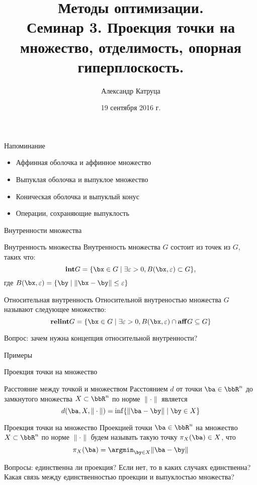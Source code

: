 \documentclass[12pt,russian]{beamer}
\title[Семинар 3]{Методы оптимизации. \\
 Семинар 3. Проекция точки на множество, отделимость, опорная гиперплоскость.}
\author{Александр Катруца}
\institute{Московский физико-технический институт,\\
Факультет Управления и Прикладной Математики}
\date{19 сентября 2016 г.}
\newcommand{\relint}{\mathbf{relint}}
\newcommand{\inter}{\mathbf{int}}
\begin{document}
\begin{frame}
\maketitle
\end{frame}

\begin{frame}{Напоминание}
\begin{itemize}
\item Аффинная оболочка и аффинное множество
\item Выпуклая оболочка и выпуклое множество
\item Коническая оболочка и выпуклый конус
\item Операции, сохраняющие выпуклость
\end{itemize}
\end{frame}

\begin{frame}{Внутренности множества}

\begin{block}{Внутренность множества}
Внутренность множества $G$ состоит из точек из $G$, таких что:
\[ 
\inter G = \{ \bx \in G \; | \; \exists \varepsilon > 0, B(\bx, \varepsilon) \subset G\},
\]
где $B(\bx, \varepsilon) = \{ \by \; | \; \| \bx - \by \| \leq \varepsilon \}$
\end{block}

\begin{block}{Относительная внутренность}
Относительной внутреностью множества $G$ называют следующее множество: 
\[
\relint G = \{ \bx \in G \; | \; \exists \varepsilon > 0,  B(\bx, \varepsilon) \cap \mathbf{aff} G \subseteq G \}
\]
\end{block}
Вопрос: зачем нужна концепция относительной внутренности?
\end{frame}

\begin{frame}{Примеры}

\end{frame}

\begin{frame}{Проекция точки на множество}
\small
\begin{block}{Расстояние между точкой и множеством}
Расстоянием $d$ от точки $\ba \in \bbR^n$ до замкнутого множества $X \subset \bbR^n$ по норме $\| \cdot \|$ является
\vspace{-4mm}
\[
d(\ba, X, \| \cdot \|) = \inf\{\| \ba - \by \| \; | \; \by \in X\}
\]
\end{block}
\begin{block}{Проекция точки на множество}
Проекцией точки $\ba \in \bbR^n$ на множество $X \subset \bbR^n$ по норме $\| \cdot \|$ будем называть такую точку $\pi_X(\ba) \in X$, что
\vspace{-4mm}
\[
\pi_X(\ba) = \argmin_{\by \in X} \| \ba - \by \|
\]
\end{block}
Вопросы: единственна ли проекция? Если нет, то в каких случаях единственна? Какая связь между единственностью проекции и выпуклостью множества?

\end{frame}
\end{document}
